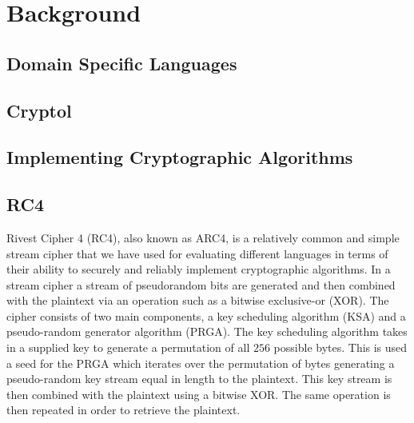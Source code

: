 \section{Background}

\subsection{Domain Specific Languages}

\subsection{Cryptol}

\subsection{Implementing Cryptographic Algorithms}

\subsection{RC4}

Rivest Cipher 4 (RC4), also known as ARC4, is a relatively common and simple stream cipher that we have 
used for evaluating different languages in terms of their ability to securely and reliably implement 
cryptographic algorithms. In a stream cipher a stream of pseudorandom bits are generated and then combined 
with the plaintext via an operation such as a bitwise exclusive-or (XOR). The cipher consists of two main 
components, a key scheduling algorithm (KSA) and a pseudo-random generator algorithm (PRGA). The key scheduling algorithm 
takes in a supplied key to generate a permutation of all $256$ possible bytes. This is used a seed for the 
PRGA which iterates over the permutation of bytes generating a pseudo-random key stream equal in length to 
the plaintext. This key stream is then combined with the plaintext using a bitwise XOR. The same operation is 
then repeated in order to retrieve the plaintext.
